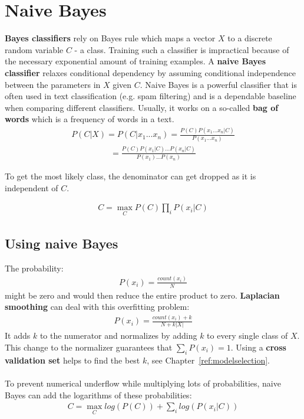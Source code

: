 \documentclass{report}
\begin{document}
\section{Naive Bayes}
{\bf Bayes classifiers} rely on Bayes rule which maps a vector $X$ to a discrete random variable $C$ - a class. Training such a classifier is impractical because of the necessary exponential amount of training examples. A {\bf naive Bayes classifier} relaxes conditional dependency by assuming conditional independence between the parameters in $X$ given $C$. Naive Bayes is a powerful classifier that is often used in text classification (e.g. spam filtering) and is a dependable baseline when comparing different classifiers. Usually, it works on a so-called {\bf bag of words} which is a frequency of words in a text.
\begin{align*}
P(C\vert X) = P(C\vert x_1...x_n) = \frac{P(C)P(x_1...x_n\vert C)}{P(x_1...x_n)}
\end{align*}
\begin{align*}
= \frac{P(C)P(x_1\vert C)...P(x_n\vert C)}{P(x_1)...P(x_n)}
\end{align*}

To get the most likely class, the denominator can get dropped as it is independent of $C$.

\begin{align*}
C = \max\limits_{C} P(C)\prod_iP(x_i\vert C)
\end{align*}

\subsection{Using naive Bayes}
The probability:
\begin{align*}
P(x_i) = \frac{count(x_i)}{N}
\end{align*}
might be zero and would then reduce the entire product to zero. {\bf Laplacian smoothing} can deal with this overfitting problem:
\begin{align*}
P(x_i) = \frac{count(x_i)+k}{N+k\vert X\vert}
\end{align*}
It adds $k$ to the numerator and normalizes by adding $k$ to every single class of $X$. This change to the normalizer guarantees that $\sum_i P(x_i) = 1$.
Using a {\bf cross validation set} helps to find the best $k$, see Chapter~\ref{ref:modelselection}.
\\
\\
To prevent numerical underflow while multiplying lots of probabilities, naive Bayes can add the logarithms of these probabilities:
\begin{align*}
C = \max\limits_{C} log(P(C))+\sum_i log(P(x_i\vert C))
\end{align*}
\end{document}
